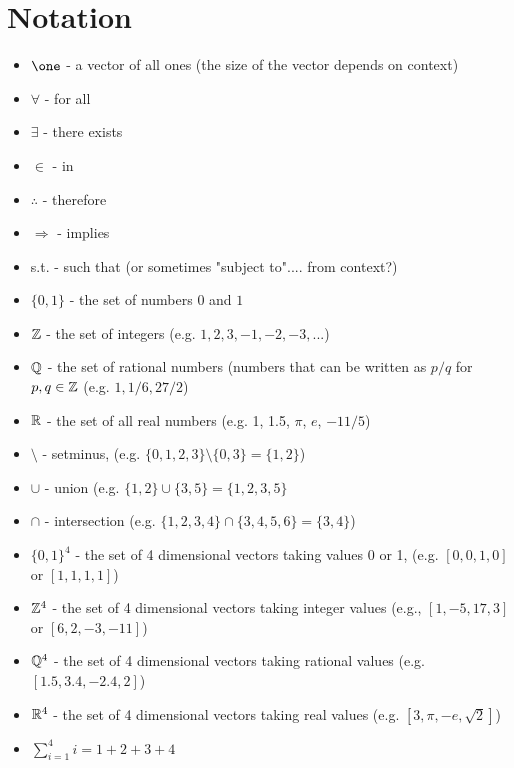 
%
%
%

\section*{Notation}
\begin{itemize}
\item $\one$ - a vector of all ones (the size of the vector depends on context)
\item $\forall$ - for all
\item $\exists$ - there exists
\item $\in$ - in
\item $\therefore$ - therefore
\item $\Rightarrow$ - implies
\item s.t.  - such that (or sometimes "subject to".... from context?)
\item $\{0,1\}$ - the set of numbers $0$ and $1$
\item ${\mathbb{Z}}$ - the set of integers (e.g. $1,2,3,-1,-2,-3,...$)
\item ${\mathbb{Q}}$ - the set of rational numbers (numbers that can be written as $p/q$ for $p,q \in {\mathbb{Z}}$ (e.g. $1, 1/6, 27/2$)
\item ${\mathbb{R}}$  - the set of all real numbers (e.g. 1, 1.5, $\pi$, $e$, $-11/5$)
\item $\setminus$ - setminus, (e.g.  $\{0,1,2,3\} \setminus \{0,3\} = \{1,2\}$)
\item $\cup$ - union (e.g.  $\{1,2\} \cup \{3,5\} = \{1,2,3,5\}$
\item $\cap$ - intersection (e.g. $\{1,2,3,4\} \cap \{3,4,5,6\} = \{3,4\}$)
\item $\{0,1\}^4$ - the set of 4 dimensional vectors taking values 0 or 1, (e.g. $[0,0,1,0]$ or $[1,1,1,1]$)
\item ${\mathbb{Z}}^4$ - the set of 4 dimensional vectors taking integer values (e.g., $[1,-5,17,3]$ or $[6 , 2, -3, -11]$)
\item ${\mathbb{Q}}^4$ - the set of 4 dimensional vectors taking rational values (e.g. $[1.5, 3.4, -2.4, 2]$)
\item ${\mathbb{R}}^4$ - the set of 4 dimensional vectors taking real values (e.g. $[3, \pi, -e, \sqrt{2}]$)
\item $\sum_{i=1}^4 i  = 1 + 2 + 3 + 4$

\end{itemize}
